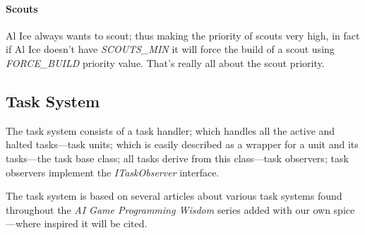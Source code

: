 \paragraph{Scouts}
Al Ice always wants to scout; thus making the priority of scouts very high, in fact if Al Ice
doesn't have \emph{SCOUTS\_MIN} it will force the build of a scout using \emph{FORCE\_BUILD}
priority value. That's really all about the scout priority.


\subsection{Task System}
\label{sec:task_system}
The task system consists of a task handler; which handles all the active and
halted tasks---task units; which is easily described as a wrapper for a unit and its tasks---the task base class; all
tasks derive from this class---task observers; task observers implement the \emph{ITaskObserver}
interface.

The task system is based on several articles about various task systems found throughout the
\emph{AI Game Programming Wisdom} series added with our own spice---where inspired it will be cited. 

